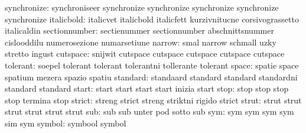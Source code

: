               synchronize: synchroniseer             synchronize
                           synchronize               synchronize
                           synchronize               synchronize
               italicbold: italicvet                 italicbold
                           italicfett                kurzivnitucne
                           corsivograssetto          italicaldin
            sectionnumber: sectienummer              sectionnumber
                           abschnittsnummer          cislooddilu
                           numerosezione             numarsetiune
                   narrow: smal                      narrow
                           schmall                   uzky
                           stretto                   ingust
                 cutspace: snijwit                   cutspace
                           cutspace                  cutspace
                           cutspace                  cutspace %
                 tolerant: soepel                    tolerant
                           tolerant                  tolerantni
                           tollerante                tolerant
                    space: spatie                    space
                           spatium                   mezera
                           spazio                    spatiu %
                 standard: standaard                 standard
                           standard                  standardni
                           standard                  standard
                    start: start                     start
                           start                     start
                           inizia                    start
                     stop: stop                      stop
                           stop                      stop
                           termina                   stop
                   strict: streng                    strict
                           streng                    striktni
                           rigido                    strict
                    strut: strut                     strut
                           strut                     strut
                           strut                     strut
                      sub: sub                       sub
                           unter                     pod
                           sotto                     sub
                      sym: sym                       sym
                           sym                       sym
                           sim                       sym
                   symbol: symbool                   symbol
